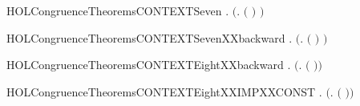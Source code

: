 \newcommand{\HOLCongruenceTheoremsCONTEXTSixXXbackward}{\UseVerbatim{HOLCongruenceTheoremsCONTEXTSixXXbackward}}
\begin{SaveVerbatim}{HOLCongruenceTheoremsCONTEXTSeven}
\HOLTokenTurnstile{} \HOLSymConst{\HOLTokenForall{}} .   \HOLSymConst{\HOLTokenImp{}}  \ensuremath{(}\HOLTokenLambda{}.  \ensuremath{(} \ensuremath{)} \ensuremath{)}
\end{SaveVerbatim}
\newcommand{\HOLCongruenceTheoremsCONTEXTSeven}{\UseVerbatim{HOLCongruenceTheoremsCONTEXTSeven}}
\begin{SaveVerbatim}{HOLCongruenceTheoremsCONTEXTSevenXXbackward}
\HOLTokenTurnstile{} \HOLSymConst{\HOLTokenForall{}} .  \ensuremath{(}\HOLTokenLambda{}.  \ensuremath{(} \ensuremath{)} \ensuremath{)} \HOLSymConst{\HOLTokenImp{}}  
\end{SaveVerbatim}
\newcommand{\HOLCongruenceTheoremsCONTEXTSevenXXbackward}{\UseVerbatim{HOLCongruenceTheoremsCONTEXTSevenXXbackward}}
\begin{SaveVerbatim}{HOLCongruenceTheoremsCONTEXTEightXXbackward}
\HOLTokenTurnstile{} \HOLSymConst{\HOLTokenForall{}} .  \ensuremath{(}\HOLTokenLambda{}.   \ensuremath{(} \ensuremath{)}\ensuremath{)} \HOLSymConst{\HOLTokenImp{}}  
\end{SaveVerbatim}
\newcommand{\HOLCongruenceTheoremsCONTEXTEightXXbackward}{\UseVerbatim{HOLCongruenceTheoremsCONTEXTEightXXbackward}}
\begin{SaveVerbatim}{HOLCongruenceTheoremsCONTEXTEightXXIMPXXCONST}
\HOLTokenTurnstile{} \HOLSymConst{\HOLTokenForall{}} .  \ensuremath{(}\HOLTokenLambda{}.   \ensuremath{(} \ensuremath{)}\ensuremath{)} \HOLSymConst{\HOLTokenImp{}}  
\end{SaveVerbatim}
\newcommand{\HOLCongruenceTheoremsCONTEXTEightXXIMPXXCONST}{\UseVerbatim{HOLCongruenceTheoremsCONTEXTEightXXIMPXXCONST}}
